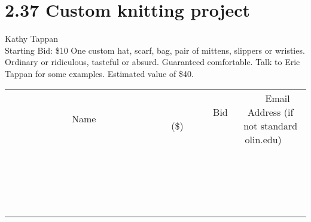 \documentclass[11pt]{article}
\begin{document}
\section*{2.37 Custom knitting project}
Kathy Tappan
\\
Starting Bid: \$10
\newline
One custom hat, scarf, bag, pair of mittens, slippers or wristies. Ordinary or ridiculous, tasteful or absurd. Guaranteed comfortable. Talk to Eric Tappan for some examples.
Estimated value of \$40.
\\[3ex]
\begin{tabular}{c c c}
~~~~~~~~~~~~~Name~~~~~~~~~~~~~ & ~~~~~~~~~Bid (\$)~~~~~~~~~  & ~~~Email Address (if not standard olin.edu)~~~\\
 & & \\
\hline
 & & \\
\hline
 & & \\
\hline
 & & \\
\hline
 & & \\
\hline
 & & \\
\hline
 & & \\
\hline
 & & \\
\hline
 & & \\
\hline
 & & \\
\hline
 & & \\
\hline
 & & \\
\hline
 & & \\
\hline
 & & \\
\hline
 & & \\
\hline
 & & \\
\hline
 & & \\
\hline
 & & \\
\hline
 & & \\
\hline
\end{tabular}
\newpage
\end{document}
